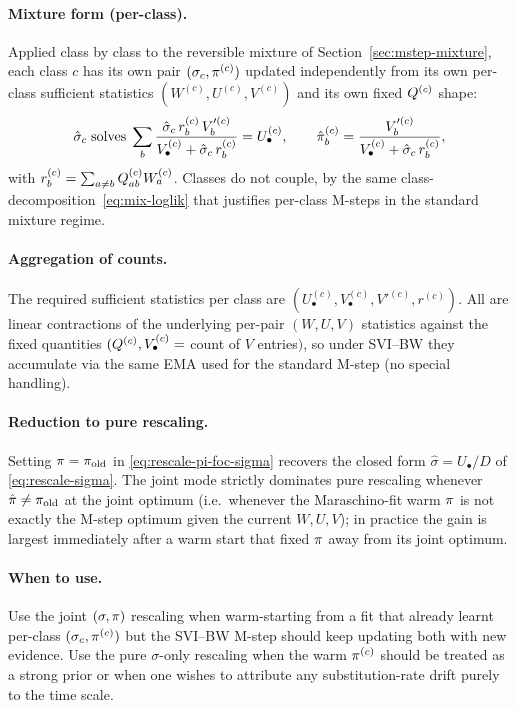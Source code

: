 \paragraph{Mixture form (per-class).}
Applied class by class to the reversible mixture of
Section~\ref{sec:mstep-mixture}, each class $c$ has its own pair
$(\sigma_c, \pi^{(c)})$ updated independently from its own per-class
sufficient statistics $(W^{(c)}, U^{(c)}, V^{(c)})$ and its own fixed
$Q^{(c)}$ shape:
\begin{equation}\label{eq:rescale-pi-class}
\hat\sigma_c\;\text{solves}\;
\sum_b \frac{\hat\sigma_c\, r^{(c)}_b\, V'^{(c)}_b}
            {V_\bullet^{(c)} + \hat\sigma_c\, r^{(c)}_b}
= U_\bullet^{(c)},
\qquad
\hat{\pi}^{(c)}_b = \frac{V'^{(c)}_b}{V_\bullet^{(c)} + \hat\sigma_c\, r^{(c)}_b},
\end{equation}
with $r^{(c)}_b = \sum_{a\neq b}Q^{(c)}_{ab} W^{(c)}_a$.  Classes
do not couple, by the same class-decomposition~\eqref{eq:mix-loglik}
that justifies per-class M-steps in the standard mixture regime.

\paragraph{Aggregation of counts.}
The required sufficient statistics per class are
$(U_\bullet^{(c)}, V_\bullet^{(c)}, V'^{(c)}, r^{(c)})$.  All are
linear contractions of the underlying per-pair $(W, U, V)$ statistics
against the fixed quantities $(Q^{(c)}, V_\bullet^{(c)} = $ count
of $V$ entries$)$, so under SVI--BW they accumulate via the same EMA
used for the standard M-step (no special handling).

\paragraph{Reduction to pure rescaling.}
Setting $\pi = \pi_{\mathrm{old}}$ in \eqref{eq:rescale-pi-foc-sigma}
recovers the closed form $\hat\sigma = U_\bullet / D$ of
\eqref{eq:rescale-sigma}.  The joint mode strictly dominates pure
rescaling whenever $\hat{\pi} \neq \pi_{\mathrm{old}}$ at the joint
optimum (i.e.\ whenever the Maraschino-fit warm $\pi$ is not exactly
the M-step optimum given the current $W, U, V$); in practice the gain
is largest immediately after a warm start that fixed $\pi$ away from
its joint optimum.

\paragraph{When to use.}
Use the joint $(\sigma, \pi)$ rescaling when warm-starting from a
fit that already learnt per-class $(\sigma_c, \pi^{(c)})$ but the
SVI--BW M-step should keep updating both with new evidence.  Use the
pure $\sigma$-only rescaling when the warm $\pi^{(c)}$ should be
treated as a strong prior or when one wishes to attribute any
substitution-rate drift purely to the time scale.


